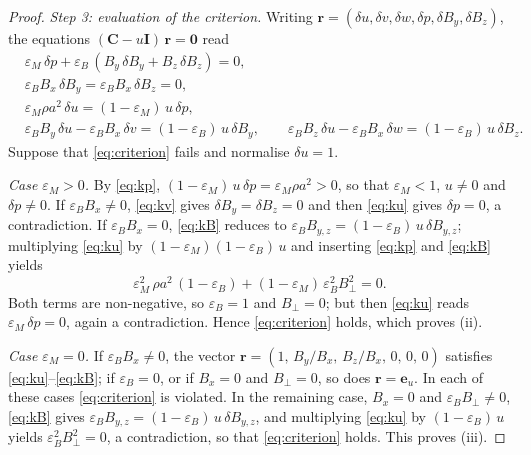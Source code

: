 \documentclass[a4paper,fleqn]{cas-sc}
\theoremstyle{remark}
\begin{document}
\begin{proof}
\emph{Step 3: evaluation of the criterion.}
Writing $\mathbf r=(\delta u,\delta v,\delta w,\delta p,\delta B_y,\delta B_z)$,
the equations $(\mathbf C-u\mathbf I)\,\mathbf r=\mathbf 0$ read
\begin{align}
&\varepsilon_M\,\delta p+\varepsilon_B\,(B_y\,\delta B_y+B_z\,\delta B_z)=0,
\label{eq:ku}\\
&\varepsilon_BB_x\,\delta B_y=\varepsilon_BB_x\,\delta B_z=0,
\label{eq:kv}\\
&\varepsilon_M\rho a^2\,\delta u=(1-\varepsilon_M)\,u\,\delta p,
\label{eq:kp}\\
&\varepsilon_BB_y\,\delta u-\varepsilon_BB_x\,\delta v=(1-\varepsilon_B)\,u\,\delta B_y,
\qquad
\varepsilon_BB_z\,\delta u-\varepsilon_BB_x\,\delta w=(1-\varepsilon_B)\,u\,\delta B_z.
\label{eq:kB}
\end{align}
Suppose that \eqref{eq:criterion} fails and normalise $\delta u=1$.
 
\emph{Case $\varepsilon_M>0$.} By \eqref{eq:kp},
$(1-\varepsilon_M)\,u\,\delta p=\varepsilon_M\rho a^2>0$, so that
$\varepsilon_M<1$, $u\neq0$ and $\delta p\neq0$. If
$\varepsilon_BB_x\neq0$, \eqref{eq:kv} gives $\delta B_y=\delta B_z=0$ and
then \eqref{eq:ku} gives $\delta p=0$, a contradiction. If
$\varepsilon_BB_x=0$, \eqref{eq:kB} reduces to
$\varepsilon_BB_{y,z}=(1-\varepsilon_B)\,u\,\delta B_{y,z}$; multiplying
\eqref{eq:ku} by $(1-\varepsilon_M)(1-\varepsilon_B)\,u$ and inserting
\eqref{eq:kp} and \eqref{eq:kB} yields
\[
\varepsilon_M^2\,\rho a^2\,(1-\varepsilon_B)
+(1-\varepsilon_M)\,\varepsilon_B^2B_\perp^2=0 .
\]
Both terms are non-negative, so $\varepsilon_B=1$ and $B_\perp=0$; but then
\eqref{eq:ku} reads $\varepsilon_M\,\delta p=0$, again a contradiction. Hence
\eqref{eq:criterion} holds, which proves (ii).
 
\emph{Case $\varepsilon_M=0$.} If $\varepsilon_BB_x\neq0$, the vector
$\mathbf r=(1,\,B_y/B_x,\,B_z/B_x,\,0,\,0,\,0)$ satisfies
\eqref{eq:ku}--\eqref{eq:kB}; if $\varepsilon_B=0$, or if $B_x=0$ and
$B_\perp=0$, so does $\mathbf r=\mathbf e_u$. In each of these cases
\eqref{eq:criterion} is violated. In the remaining case, $B_x=0$ and
$\varepsilon_BB_\perp\neq0$, \eqref{eq:kB} gives
$\varepsilon_BB_{y,z}=(1-\varepsilon_B)\,u\,\delta B_{y,z}$, and multiplying
\eqref{eq:ku} by $(1-\varepsilon_B)\,u$ yields
$\varepsilon_B^2B_\perp^2=0$, a contradiction, so that \eqref{eq:criterion}
holds. This proves (iii).
\end{proof}
 
\end{document}
